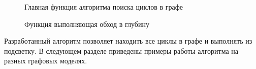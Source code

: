 \begin{figure}[ht!]
\caption{Главная функция алгоритма поиска циклов в графе}
\label{fig:example_main_dfs}
\end{figure}

\begin{figure}[ht!]
\caption{Функция выполняющая обход в глубину}
\label{fig:example_process_dfs}
\end{figure}

Разработанный алгоритм позволяет находить все циклы в графе и выполнять из подсветку. В следующем разделе приведены примеры работы алгоритма на разных графовых моделях.
